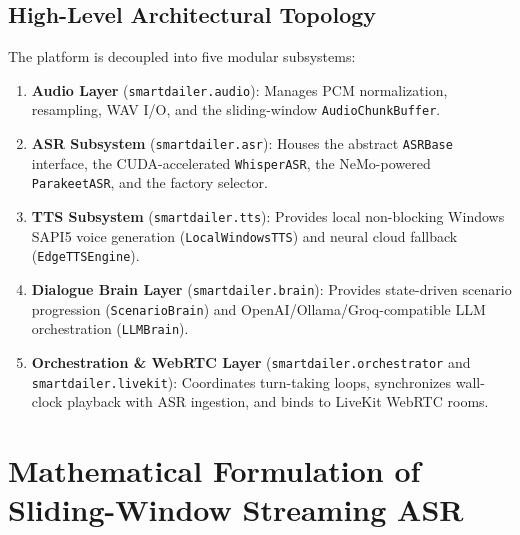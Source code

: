 \documentclass[11pt,a4paper,titlepage]{report}
\begin{document}
\section{High-Level Architectural Topology}
The platform is decoupled into five modular subsystems:
\begin{enumerate}
    \item \textbf{Audio Layer} (\texttt{smartdailer.audio}): Manages PCM normalization, resampling, WAV I/O, and the sliding-window \texttt{AudioChunkBuffer}.
    \item \textbf{ASR Subsystem} (\texttt{smartdailer.asr}): Houses the abstract \texttt{ASRBase} interface, the CUDA-accelerated \texttt{WhisperASR}, the NeMo-powered \texttt{ParakeetASR}, and the factory selector.
    \item \textbf{TTS Subsystem} (\texttt{smartdailer.tts}): Provides local non-blocking Windows SAPI5 voice generation (\texttt{LocalWindowsTTS}) and neural cloud fallback (\texttt{EdgeTTSEngine}).
    \item \textbf{Dialogue Brain Layer} (\texttt{smartdailer.brain}): Provides state-driven scenario progression (\texttt{ScenarioBrain}) and OpenAI/Ollama/Groq-compatible LLM orchestration (\texttt{LLMBrain}).
    \item \textbf{Orchestration \& WebRTC Layer} (\texttt{smartdailer.orchestrator} and \texttt{smartdailer.livekit}): Coordinates turn-taking loops, synchronizes wall-clock playback with ASR ingestion, and binds to LiveKit WebRTC rooms.
\end{enumerate}

\newpage

\chapter{Mathematical Formulation of Sliding-Window Streaming ASR}
\end{document}

